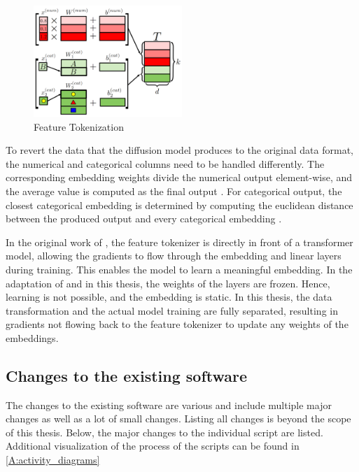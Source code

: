 \begin{figure}[h]
	\centering
	\includegraphics[width=0.5\textwidth]{images/ft.png}
	\caption{Feature Tokenization \cite[Figure 2a, p.4]{gorishniy2021RevisitingDeepLearning}}
	\label{fig:ft}
\end{figure}

To revert the data that the diffusion model produces to the original data format, the numerical and categorical columns need to be handled differently.
The corresponding embedding weights divide the numerical output element-wise, and the average value is computed as the final output \cite{zheng2022DiffusionModelsMissing}.
For categorical output, the closest categorical embedding is determined by computing the euclidean distance between the produced output and every categorical embedding \cite{zheng2022DiffusionModelsMissing}.

In the original work of \cite{gorishniy2021RevisitingDeepLearning}, the feature tokenizer is directly in front of a transformer model, allowing the gradients to flow through the embedding and linear layers during training.
This enables the model to learn a meaningful embedding.
In the adaptation of \cite{2023DiffusionModelsMissing} and in this thesis, the weights of the layers are frozen.
Hence, learning is not possible, and the embedding is static.
In this thesis, the data transformation and the actual model training are fully separated,
resulting in gradients not flowing back to the feature tokenizer to update any weights of the embeddings.

\subsection{Changes to the existing software}
\label{ch:methods-changes}
The changes to the existing software are various and include multiple major changes as well as a lot of small changes.
Listing all changes is beyond the scope of this thesis. 
Below, the major changes to the individual script are listed.
Additional visualization of the process of the scripts can be found in \autoref{A:activity_diagrams}

